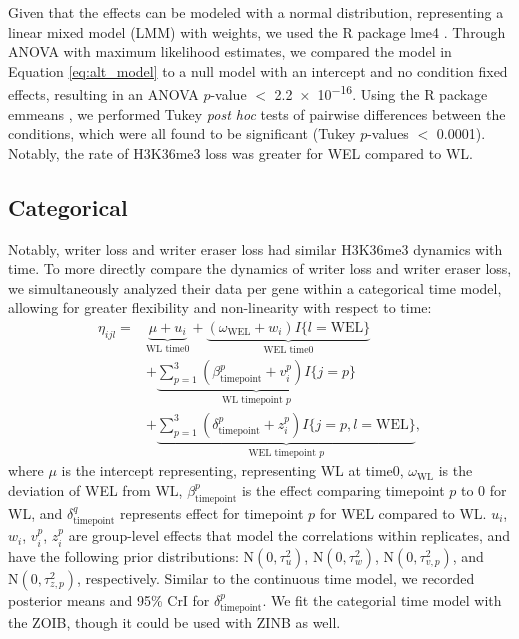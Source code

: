 \documentclass[12pt]{extarticle}
\begin{document}
Given that the effects can be modeled with a normal distribution, representing a linear mixed model (LMM) with weights, we used the R package lme4 \cite{Bates2015}. Through ANOVA \cite{Venables2010} with maximum likelihood estimates, we compared the model in Equation \ref{eq:alt_model} to a null model with an intercept and no condition fixed effects, resulting in an ANOVA $p$-value $<$ \num{2.2e-16}. Using the R package emmeans \cite{emmeans}, we performed Tukey \textit{post hoc} tests of pairwise differences \cite{Venables2010} between the conditions, which were all found to be significant (Tukey $p$-values $<$ 0.0001). Notably, the rate of H3K36me3 loss was greater for WEL compared to WL.

\subsection*{Categorical}

Notably, writer loss and writer eraser loss had similar H3K36me3 dynamics with time. To more directly compare the dynamics of writer loss and writer eraser loss, we simultaneously analyzed their data per gene within a categorical time model, allowing for greater flexibility and non-linearity with respect to time:
\begin{align}
	\eta_{ijl} = &\underbrace{\mu + u_{i}}_{\text{WL time0}} + \underbrace{(\omega_{\text{WEL}} + w_{i})I\{l = \text{WEL}\}}_{\text{WEL time0}} \\ 
	&+ \underbrace{\sum_{p = 1}^{3}(\beta_{\text{timepoint}}^{p} + v_{i}^{p})I\{j = p\}}_{\text{WL timepoint }p} \nonumber \\ 
	&+ \underbrace{\sum_{p = 1}^{3}(\delta_{\text{timepoint}}^{p} + z_{i}^{p})I\{j = p, l = \text{WEL}\}}_{\text{WEL timepoint }p},\nonumber
\end{align}
where $\mu$ is the intercept representing, representing WL at time0, $\omega_{\text{WL}}$ is the deviation of WEL from WL, $\beta_{\text{timepoint}}^{p}$ is the effect comparing timepoint $p$ to $0$ for WL, and $\delta_{\text{timepoint}}^{q}$ represents effect for timepoint $p$ for WEL compared to WL. $u_{i}$, $w_{i}$, $v_{i}^{p}$, $z_{i}^{p}$ are group-level effects that model the correlations within replicates, and have the following prior distributions: $\text{N}(0, \tau^{2}_{u})$, $\text{N}(0, \tau^{2}_{w})$, $\text{N}(0, \tau^{2}_{v,p})$, and $\text{N}(0, \tau^{2}_{z,p})$, respectively. 
Similar to the continuous time model, we recorded posterior means and 95\% CrI for $\delta_{\text{timepoint}}^{p}$. We fit the categorial time model with the ZOIB, though it could be used with ZINB as well.
\end{document}
